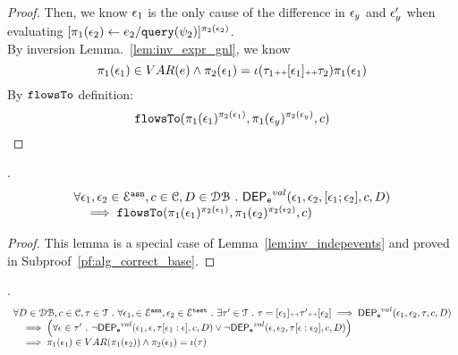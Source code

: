 \begin{proof}
Then, we know $\mathtt{\epsilon}_1$ is the only cause of the difference in $\mathtt{\epsilon}_y$ and $\mathtt{\epsilon}_y'$ when evaluating 
$[\mathrel{ \pi_1(\mathtt{\epsilon}_2) \leftarrow e_2 / {\tt query}(\psi_2) }]{}^{\pi_2(\mathtt{\epsilon}_2)}$.
%
\\
By inversion Lemma.~\ref{lem:inv_expr_gnl}, we know
\[
  \pi_1(\mathtt{\epsilon}_1) \in VAR(e) \land {\pi_2(\ensuremath{\mathtt{\epsilon}}_1)} = \iota(\mathtt{\tau}_1 {\scriptscriptstyle ++} [\mathtt{\epsilon}_1] {\scriptscriptstyle ++} \mathtt{\tau}_2) \pi_1(\mathtt{\epsilon}_1) 
\]
%
By $\mathtt{flowsTo}$ definition:
\[
  \mathtt{flowsTo}(\pi_1(\mathtt{\epsilon}_1)^{\pi_2(\mathtt{\epsilon}_1)}, \pi_1(\mathtt{\epsilon}_y)^{\pi_2(\mathtt{\epsilon}_y)}, c)
\]
\end{proof}
%
\begin{lem}.
	\label{lem:emptytrace_dep}
	\[
	\begin{array}{l}
		\forall \mathtt{\epsilon}_1, \mathtt{\epsilon}_2 \in \mathcal{E}^{\mathtt{{asn}}}, c \in \mathcal{C}, D \in \mathcal{DB} 
		~.~ 
		\mathsf{DEP_{\mathtt{e}}}^{val}(\mathtt{\epsilon}_1, \mathtt{\epsilon}_2, [\mathtt{\epsilon}_1; \mathtt{\epsilon}_2],  c, D) 
		\\ \quad 
		\implies 
		\mathtt{flowsTo}(\pi_1(\mathtt{\epsilon}_1)^{\pi_2(\mathtt{\epsilon}_1)}, \pi_1(\mathtt{\epsilon}_2)^{\pi_2(\mathtt{\epsilon}_2)}, c)
	\end{array}
	\]
\end{lem}
\begin{proof}
	This lemma is a special case of Lemma~\ref{lem:inv_indepevents} and proved in Subproof~\ref{pf:alg_correct_base}.
\end{proof}
%
\begin{lem}.
	\label{lem:inv_indepeventstest}
	\[
	\begin{array}{l}
		\forall D \in \dbdom , c \in \cdom, \trace \in \mathcal{T} \st \forall \event_1,\in \eventset^{\asn}, \event_2 \in \eventset^{\test} \st
		 \exists \trace' \in \mathcal{T} \st \trace = [\event_1] \tracecat \trace' \tracecat [\event_2]
		\implies
		\eventdep^{val}(\event_1, \event_2, \trace, c, D) 
		\\ \quad 
		\implies 
		\left( \forall \event \in \trace' \st \neg \eventdep^{val}(\event_1, \event, \trace[\event_1:\event], c, D)
		\lor \neg \eventdep^{val}(\event, \event_2, \trace[\event:\event_2], c, D) 
		\right) 
		\\ \quad 
		\implies 
		\pi_1(\event_1) \in VAR(\pi_1(\event_2)) \land {\pi_2(\event_1)} = \llabel(\trace)
	\end{array}
	\]
\end{lem}
